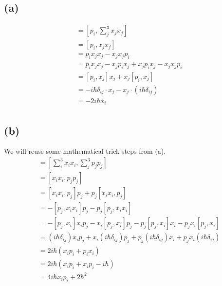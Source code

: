 \documentclass[letter, 10pts]{article}
\newcommand{\hb}{\hbar}
\begin{document}
\subsection*{(a)} 
\begin{align*}
	[p_i , r^2] &= \left[p_i , \sum_{j}^{3} x_j x_j\right] \\
		    &= [p_i, x_j x_j]  \\
		    &= p_i x_j x_j - x_j x_j p_i   \\
		    &= p_i x_j x_j - x_j p_i x_j + x_j p_i x_j - x_j x_j p_i \\
		    &= [p_i, x_j] x_j + x_j [p_i, x_j]  \\
		    &= - i \hb \delta_{ij} \cdot  x_j - x_j \cdot  (i \hb \delta_{ij}) \\
		    &= -2i \hb x_i  \\
\end{align*}


\subsection*{(b)} 
We will reuse some mathematical trick steps from (a). 
\begin{align*}
	[r^2, p^2] &= \left[
		\sum_{i}^{3} x_i x_i, 
		\sum_{j}^{3} p_j p_j
	\right]\\
		   &= [x_i x_i , p_j p_j] 
		  \\
		   &=[x_i x_i, p_j]p_j + p_j[x_i x_i, p_j]  \\
		   &=-[p_j,x_i x_i]p_j - p_j[p_j,x_i x_i]  \\
		   &= -[p_j, x_i]x_i p_j - x_i[p_j, x_i]p_j
		   -p_j [p_j, x_i] x_i - p_j x_i[p_j,x_i]\\
		   &= (i \hb \delta_{ij}) x_i p_j + 
		   x_i (i \hb \delta_{ij}) p_j + 
		   p_j (i \hb \delta_{ij}) x_i 
		   + 
		   p_j x_i (i \hb \delta_{ij})\\
		   &=2 i\hb (x_i p_i + p_i x_i) \\
		   &= 2i\hb (x_i p_i + x_i p_i - i \hb ) \\
		   &= 4 i \hb x_i p_i + 2 \hb^2 \\
\end{align*}
\end{document}
